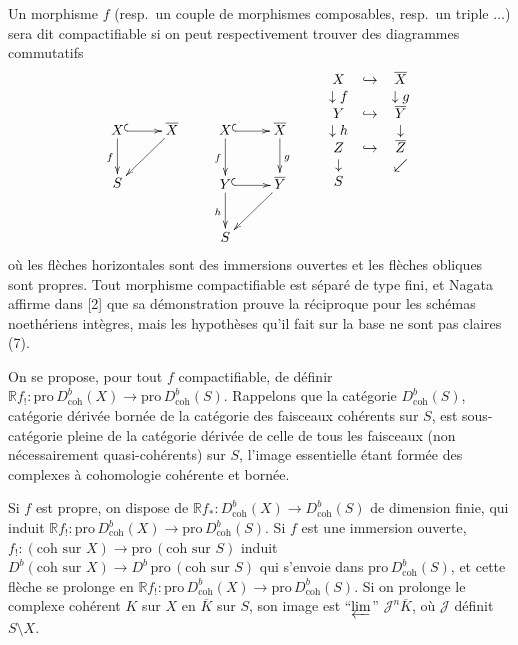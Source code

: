 \documentclass[12pt]{amsart}
\theoremstyle{plain}
\theoremstyle{definition}
\newcommand{\Pro}{\text{pro}\,}
\newcommand{\coh}{\text{coh}}
\newcommand{\cJ}{\mathcal{J}}
\newcommand{\cDb}{D^{b}}
\newcommand{\bR}{\mathbb{R}}
\begin{document}
Un morphisme $f$ (resp.\ un couple de morphismes composables, resp.\ un triple $\ldots$) sera dit compactifiable si on peut respectivement trouver des diagrammes commutatifs
\[
\xymatrix{
X \ar@{^{(}->}[r] \ar[d]_{f} & \overline{X} \ar[dl] \\
S &
}
\qquad
\xymatrix{
X \ar@{^{(}->}[r] \ar[d]_{f} & \overline{X} \ar[d]^{g} \\
Y \ar@{^{(}->}[r] \ar[d]_{h} & \overline{Y} \ar[dl] \\
S &
}
\qquad
\begin{array}{ccc}
X & \hookrightarrow & \overline{X} \\
\downarrow f && \downarrow g \\
Y & \hookrightarrow & \overline{Y} \\
\downarrow h && \downarrow \\
Z & \hookrightarrow & \overline{Z} \\
\downarrow && \swarrow \\
S &&
\end{array}
\]
o\`u les fl\`eches horizontales sont des immersions ouvertes et les fl\`eches obliques sont propres. Tout morphisme compactifiable est s\'epar\'e de type fini, et Nagata affirme dans [2] que sa d\'emonstration prouve la r\'eciproque pour les sch\'emas noeth\'eriens int\`egres, mais les hypoth\`eses qu'il fait sur la base ne sont pas claires (7).

On se propose, pour tout $f$ compactifiable, de d\'efinir $\bR f_{!}: \Pro\cDb_{\coh}(X) \to \Pro\cDb_{\coh}(S)$. Rappelons que la cat\'egorie $\cDb_{\coh}(S)$, cat\'egorie d\'eriv\'ee born\'ee de la cat\'egorie des faisceaux coh\'erents sur $S$, est sous-cat\'egorie pleine de la cat\'egorie d\'eriv\'ee de celle de tous les faisceaux (non n\'ecessairement quasi-coh\'erents) sur $S$, l'image essentielle \'etant form\'ee des complexes \`a cohomologie coh\'erente et born\'ee.

Si $f$ est propre, on dispose de $\bR f_{*}: \cDb_{\coh}(X) \to \cDb_{\coh}(S)$ de dimension finie, qui induit $\bR f_{!}: \Pro\cDb_{\coh}(X) \to \Pro\cDb_{\coh}(S)$. Si $f$ est une immersion ouverte, $f_{!}: (\text{coh sur } X) \to \Pro(\text{coh sur } S)$ induit $\cDb(\text{coh sur } X) \to \cDb\,\Pro(\text{coh sur } S)$ qui s'envoie dans $\Pro\cDb_{\coh}(S)$, et cette fl\`eche se prolonge en $\bR f_{!}: \Pro\cDb_{\coh}(X) \to \Pro\cDb_{\coh}(S)$. Si on prolonge le complexe coh\'erent $K$ sur $X$ en $\overline{K}$ sur $S$, son image est ``$\varprojlim$'' $\cJ^{n}\overline{K}$, o\`u $\cJ$ d\'efinit $S \setminus X$.
\end{document}
